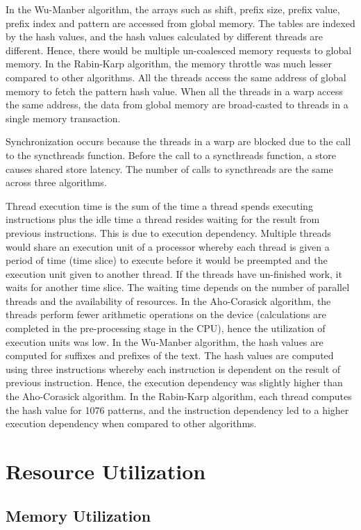 In the Wu-Manber algorithm, the arrays such as shift, prefix size, prefix value, prefix index and pattern are accessed from global memory. The tables are indexed by the hash values, and the hash values calculated by different threads are different. Hence, there would be multiple un-coalesced memory requests to global memory. In the Rabin-Karp algorithm, the memory throttle was much lesser compared to other algorithms. All the threads access the same address of global memory to fetch the pattern hash value. When all the threads in a warp access the same address, the data from global memory are broad-casted to threads in a single memory transaction. 

Synchronization occurs because the threads in a warp are blocked due to the call to the syncthreads function. Before the call to a syncthreads function, a store causes shared store latency. The number of calls to syncthreads are the same across three algorithms.

Thread execution time is the sum of the time a thread spends executing instructions plus the idle time a thread resides waiting for the result from previous instructions. This is due to execution dependency. Multiple threads would share an execution unit of a processor whereby each thread is given a period of time (time slice) to execute before it would be preempted and the execution unit given to another thread. If the threads have un-finished work, it waits for another time slice. The waiting time depends on the number of parallel threads and the availability of resources. In the Aho-Corasick algorithm, the threads perform fewer arithmetic operations on the device (calculations are completed in the  pre-processing stage in the CPU), hence the utilization of execution units was low. In the Wu-Manber algorithm, the hash values are computed for suffixes and prefixes of the text. The hash values are computed using three instructions whereby each instruction is dependent on the result of previous instruction. Hence, the execution dependency was slightly higher than the Aho-Corasick algorithm. In the Rabin-Karp algorithm, each thread computes the hash value for 1076 patterns, and the instruction dependency led to a higher execution dependency when compared to other algorithms.

\section{Resource Utilization}
\vspace{\topsep}
\subsection{Memory Utilization}


